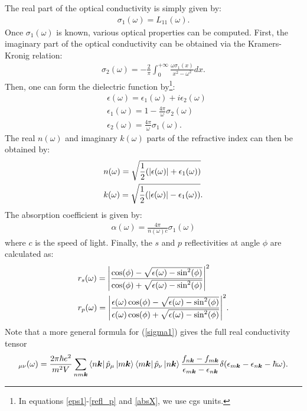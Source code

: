 \documentclass[a4,12pts]{extarticle}
\begin{document}
The real part of the optical conductivity is simply given by:
\begin{align}
\sigma_{1}(\omega)=L_{11}(\omega). \label{sigma1}
\end{align}
Once $\sigma_{1}(\omega)$ is known, various optical properties can be computed.
First, the imaginary part of the optical conductivity can be obtained via the Kramers-Kronig relation:
\begin{align}
\sigma_{2}(\omega)=-\frac{2}{\pi}\int_{0}^{+\infty}\frac{\omega\sigma_{1}(x)}{x^2-\omega^2}dx. \label{sigma2}
\end{align}
Then, one can form the dielectric function by\footnote{In equations \ref{eps1}-\ref{refl_p} and \ref{absX}, we use cgs units.}:
\begin{align}
&\epsilon(\omega)=\epsilon_{1}(\omega)+i\epsilon_{2}(\omega) \label{eps}\\
&\epsilon_{1}(\omega)=1-\frac{4\pi}{\omega}\sigma_{2}(\omega) \label{eps1}\\
&\epsilon_{2}(\omega)=\frac{4\pi}{\omega}\sigma_1(\omega). \label{eps2}
\end{align}
The real $n(\omega)$ and imaginary $k(\omega)$ parts of the refractive index can then be obtained by:
\begin{align}
&n(\omega)=\sqrt{\frac{1}{2}(\abs{\epsilon(\omega)}+\epsilon_1(\omega))} \label{nn}\\
&k(\omega)=\sqrt{\frac{1}{2}(\abs{\epsilon(\omega)}-\epsilon_1(\omega))} \label{kk}.
\end{align}
The absorption coefficient is given by:
\begin{align}
\alpha(\omega)=\frac{4\pi}{n(\omega)c}\sigma_1(\omega) \label{abso}
\end{align}
where $c$ is the speed of light. Finally, the $s$ and $p$ reflectivities at angle $\phi$ are calculated as:
\begin{align}
	& r_s(\omega)=\abs{\frac{\cos(\phi)-\sqrt{\epsilon(\omega)-\sin^2(\phi)}}{\cos(\phi)+\sqrt{\epsilon(\omega)-\sin^2(\phi)}}}^2 \label{refl_s}\\
	& r_p(\omega)=\abs{\frac{\epsilon(\omega)\cos(\phi)-\sqrt{\epsilon(\omega)-\sin^2(\phi)}}{\epsilon(\omega)\cos(\phi)+\sqrt{\epsilon(\omega)-\sin^2(\phi)}}}^2. \label{refl_p}
\end{align}
Note that a more general formula for (\ref{sigma1}) gives the full real conductivity tensor
\begin{align}
[\sigma_{1}]_{\mu\nu}(\omega)=\frac{2\pi \hbar e^{2}}{m^{2}V}\sum_{nm\boldsymbol{k}}\bra{n\boldsymbol{k}}\hat{p}_{\mu}\ket{m\boldsymbol{k}}\bra{m\boldsymbol{k}}\hat{p}_{\nu}\ket{n\boldsymbol{k}}
\frac{f_{n\boldsymbol{k}}-f_{m\boldsymbol{k}}}{\epsilon_{m\boldsymbol{k}}-\epsilon_{n\boldsymbol{k}}}\delta(\epsilon_{m\boldsymbol{k}}-\epsilon_{n\boldsymbol{k}}-\hbar\omega). \label{sig_tens}
\end{align}
\end{document}
